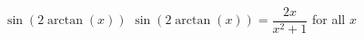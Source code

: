  {$\sin \left( 2\arctan \left( x \right) \right)$ }
{ $\sin \left( 2\arctan \left( x \right) \right) = \dfrac{2x}{x^{2} + 1}$ for all $x$}

